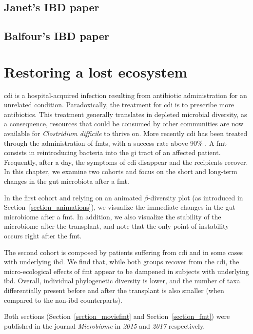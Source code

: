 \documentclass[12pt,chapterheads]{ucsd}
\begin{document}
    \section{Janet's IBD paper}\label{plane}
    \section{Balfour's IBD paper}\label{ibd}
\fi

\chapter{Restoring a lost ecosystem}\label{chapter_fmts}
\glsresetall

\gls{cdi} is a hospital-acquired infection resulting from antibiotic 
administration for an unrelated condition. Paradoxically, the treatment for 
\gls{cdi} is to prescribe more antibiotics. This treatment generally translates 
in depleted microbial diversity, as a consequence, resources that could be 
consumed by other communities are now available for \textit{Clostridium 
difficile} to thrive on.  More recently \gls{cdi} has been treated through the 
administration of \glspl{fmt}, with a success rate above 90\% \cite{RN4129}. A 
\gls{fmt} consists in reintroducing bacteria into the \gls{gi} tract of an 
affected patient. Frequently, after a day, the symptoms of \gls{cdi} disappear 
and the recipients recover. In this chapter, we examine two cohorts and focus 
on the short and long-term changes in the gut microbiota after a \gls{fmt}.

In the first cohort and relying on an animated $\beta$-diversity plot (as 
introduced in Section~\ref{section_animations}), we visualize the immediate 
changes in the gut microbiome after a \gls{fmt}. In addition, we also visualize 
the stability of the microbiome after the transplant, and note that the only 
point of instability occurs right after the \gls{fmt}.

The second cohort is composed by patients suffering from \gls{cdi} and in some 
cases with underlying \gls{ibd}. We find that, while both groups recover from 
the \gls{cdi}, the micro-ecological effects of \gls{fmt} appear to be dampened 
in subjects with underlying \gls{ibd}. Overall, individual phylogenetic 
diversity is lower, and the number of taxa differentially present before and 
after the transplant is also smaller (when compared to the non-\gls{ibd} 
counterparts).

Both sections (Section~\ref{section_moviefmt} and Section~\ref{section_fmt}) 
were published in the journal \textsl{Microbiome} in \textsl{2015} and 
\textsl{2017} respectively.
\end{document}
